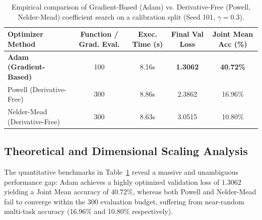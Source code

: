 \documentclass{article}
\theoremstyle{plain}
\theoremstyle{definition}
\theoremstyle{remark}
\begin{document}
\begin{table}[h]
\caption{Empirical comparison of Gradient-Based (Adam) vs. Derivative-Free (Powell, Nelder-Mead) coefficient search on a calibration split (Seed 101, $\gamma=0.3$).}
\label{tab:derivative_free_results}
\vskip 0.15in
\begin{center}
\begin{small}
\begin{sc}
\begin{tabular}{lcccc}
\toprule
Optimizer Method & Function / Grad. Eval. & Exec. Time (s) & Final Val Loss & Joint Mean Acc (\%) \\
\midrule
\textbf{Adam (Gradient-Based)}   & 100 & 8.16s & \textbf{1.3062} & \textbf{40.72\%} \\
Powell (Derivative-Free)    & 300 & 8.86s & 2.3862 & 16.96\% \\
Nelder-Mead (Derivative-Free) & 300 & 8.63s & 3.0515 & 10.80\% \\
\bottomrule
\end{tabular}
\end{sc}
\end{small}
\end{center}
\vskip -0.1in
\end{table}

\subsection{Theoretical and Dimensional Scaling Analysis}

The quantitative benchmarks in Table~\ref{tab:derivative_free_results} reveal a massive and unambiguous performance gap: Adam achieves a highly optimized validation loss of $1.3062$ yielding a Joint Mean accuracy of $40.72\%$, whereas both Powell and Nelder-Mead fail to converge within the 300 evaluation budget, suffering from near-random multi-task accuracy (16.96\% and 10.80\% respectively).
\end{document}
